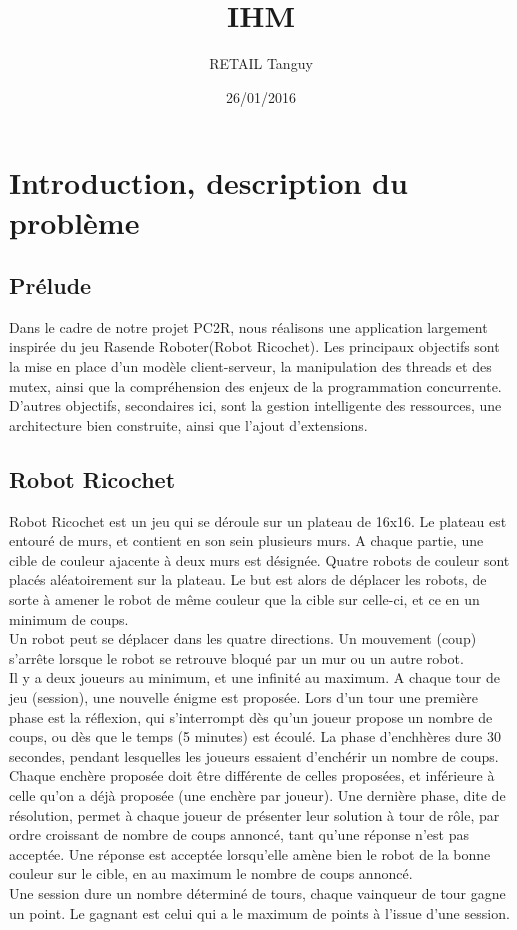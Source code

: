 \documentclass[11pt]{article}
\title{\textbf{IHM \\}}
\author{RETAIL Tanguy}
\date{26/01/2016}
\begin{document}
\maketitle
\tableofcontents
\newpage


\section{Introduction, description du problème}
\subsection{Prélude}
Dans le cadre de notre projet PC2R, nous réalisons une application largement inspirée du jeu Rasende Roboter(Robot Ricochet). Les principaux objectifs sont la mise en place d'un modèle client-serveur, la manipulation des threads et des mutex, ainsi que la compréhension des enjeux de la programmation concurrente. D'autres objectifs, secondaires ici, sont la gestion intelligente des ressources, une architecture bien construite, ainsi que l'ajout d'extensions.
\subsection{Robot Ricochet}
Robot Ricochet est un jeu qui se déroule sur un plateau de 16x16. Le plateau est entouré de murs, et contient en son sein plusieurs murs. A chaque partie, une cible de couleur ajacente à deux murs est désignée. Quatre robots de couleur sont placés aléatoirement sur la plateau. Le but est alors de déplacer les robots, de sorte à amener le robot de même couleur que la cible sur celle-ci, et ce en un minimum de coups.\\
Un robot peut se déplacer dans les quatre directions. Un mouvement (coup) s'arrête lorsque le robot se retrouve bloqué par un mur ou un autre robot.\\
Il y a deux joueurs au minimum, et une infinité au maximum. A chaque tour de jeu (session), une nouvelle énigme est proposée. Lors d'un tour une première phase est la réflexion, qui s'interrompt dès qu'un joueur propose un nombre de coups, ou dès que le temps (5 minutes) est écoulé. La phase d'enchhères dure 30 secondes, pendant lesquelles les joueurs essaient d'enchérir un nombre de coups. Chaque enchère proposée doit être différente de celles proposées, et inférieure à celle qu'on a déjà proposée (une enchère par joueur). Une dernière phase, dite de résolution, permet à chaque joueur de présenter leur solution à tour de rôle, par ordre croissant de nombre de coups annoncé, tant qu'une réponse n'est pas acceptée. Une réponse est acceptée lorsqu'elle amène bien le robot de la bonne couleur sur le cible, en au maximum le nombre de coups annoncé.\\
Une session dure un nombre déterminé de tours, chaque vainqueur de tour gagne un point. Le gagnant est celui qui a le maximum de points à l'issue d'une session.
\end{document}
